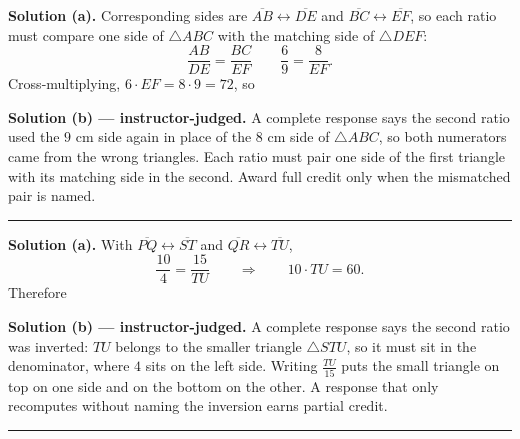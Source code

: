 \documentclass[12pt]{article}
\begin{document}




\noindent\textbf{Solution (a).} Corresponding sides are
$\overline{AB} \leftrightarrow \overline{DE}$ and
$\overline{BC} \leftrightarrow \overline{EF}$, so each ratio must compare one
side of $\triangle ABC$ with the matching side of $\triangle DEF$:
\[ \frac{AB}{DE} = \frac{BC}{EF} \qquad \frac{6}{9} = \frac{8}{EF}. \]
Cross-multiplying, $6 \cdot EF = 8 \cdot 9 = 72$, so 

\noindent\textbf{Solution (b) --- instructor-judged.} A complete response says
the second ratio used the $9$ cm side again in place of the $8$ cm side of
$\triangle ABC$, so both numerators came from the wrong triangles. Each ratio
must pair one side of the first triangle with its matching side in the second.
Award full credit only when the mismatched pair is named.

\vspace{0.2cm}\noindent\rule{\linewidth}{0.2pt}


\noindent\textbf{Solution (a).} With
$\overline{PQ} \leftrightarrow \overline{ST}$ and
$\overline{QR} \leftrightarrow \overline{TU}$,
\[ \frac{10}{4} = \frac{15}{TU} \qquad \Rightarrow \qquad 10 \cdot TU = 60. \]
Therefore 

\noindent\textbf{Solution (b) --- instructor-judged.} A complete response says
the second ratio was inverted: $TU$ belongs to the smaller triangle
$\triangle STU$, so it must sit in the denominator, where $4$ sits on the left
side. Writing $\frac{TU}{15}$ puts the small triangle on top on one side and on
the bottom on the other. A response that only recomputes without naming the
inversion earns partial credit.

\vspace{0.2cm}\noindent\rule{\linewidth}{0.2pt}

\end{document}
